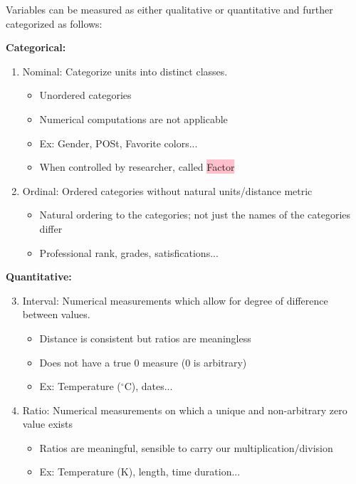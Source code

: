 \documentclass[a4paper,11pt]{article}
\begin{document}
Variables can be measured as either qualitative or quantitative and further categorized as follows:

\textbf{Categorical:}
\begin{enumerate}
\item Nominal: Categorize units into distinct classes. 
\begin{itemize}
\item Unordered categories
\item Numerical computations are not applicable
\item Ex: Gender, POSt, Favorite colors...
\item When controlled by researcher, called \colorbox{pink}{Factor}
\end{itemize}
\item Ordinal: Ordered categories without natural units/distance metric
\begin{itemize}
\item Natural ordering to the categories; not just the names of the categories differ
\item Professional rank, grades, satisfications... 
\end{itemize}
\end{enumerate}
\textbf{Quantitative:}
\begin{enumerate}
\setcounter{enumi}{2}
\item Interval: Numerical measurements which allow for degree of difference between values. 
\begin{itemize}
\item Distance is consistent but ratios are meaningless
\item Does not have a true 0 measure (0 is arbitrary)
\item Ex: Temperature ($^{\circ}$C), dates...
\end{itemize}
\item Ratio: Numerical measurements on which a unique and non-arbitrary zero value exists
\begin{itemize}
\item Ratios are meaningful, sensible to carry our multiplication/division
\item Ex: Temperature (K), length, time duration...
\end{itemize}
\end{enumerate}
\end{document}
